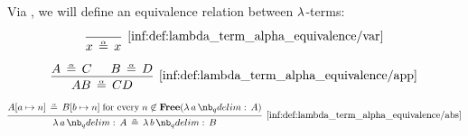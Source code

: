 \begin{definition}\label{def:lambda_term_alpha_equivalence}\mimprovised
  Via , we will define an equivalence relation between \( \mathrm{\lambda} \)-terms:

  \begin{paracol}{2}
    \begin{leftcolumn}
      \begin{equation*}\taglabel[\ensuremath{ \logic{Var}_\alpha }]{inf:def:lambda_term_alpha_equivalence/var}
        \begin{prooftree}
          \infer0[\ref{inf:def:lambda_term_alpha_equivalence/var}]{ x \aequiv x }
        \end{prooftree}
      \end{equation*}
    \end{leftcolumn}

    \begin{rightcolumn}
      \begin{equation*}\taglabel[\ensuremath{ \logic{App}_\alpha }]{inf:def:lambda_term_alpha_equivalence/app}
        \begin{prooftree}
          \hypo{ A \aequiv C }
          \hypo{ B \aequiv D }
          \infer2[\ref{inf:def:lambda_term_alpha_equivalence/app}]{ AB \aequiv CD }
        \end{prooftree}
      \end{equation*}
    \end{rightcolumn}
  \end{paracol}

  \begin{equation*}\taglabel[\ensuremath{ \logic{Abs}_\alpha }]{inf:def:lambda_term_alpha_equivalence/abs}
    \begin{prooftree}
      \hypo{ A[a \mapsto n] \aequiv B[b \mapsto n] \T{for every} n \not\in \op*{Free}(\qabs a A) }
      \infer1[\ref{inf:def:lambda_term_alpha_equivalence/abs}]{ \qabs a A \aequiv \qabs b B }
    \end{prooftree}
  \end{equation*}
\end{definition}
